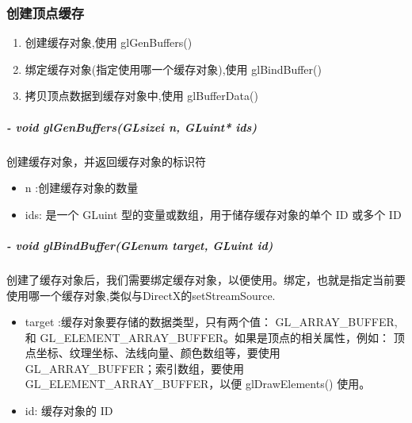 \documentclass[UTF8,a4paper,12pt]{ctexbook}
\begin{document}
		\subsubsection{创建顶点缓存}
			\begin{enumerate}
				\item 创建缓存对象,使用 glGenBuffers()
				\item 绑定缓存对象(指定使用哪一个缓存对象),使用 glBindBuffer()
				\item 拷贝顶点数据到缓存对象中,使用 glBufferData()
			\end{enumerate}
			
			\subparagraph{- void glGenBuffers(GLsizei n, GLuint* ids)}创建缓存对象，并返回缓存对象的标识符
				\begin{itemize}
					\item n :创建缓存对象的数量
					\item ids: 是一个 GLuint 型的变量或数组，用于储存缓存对象的单个 ID 或多个 ID
				\end{itemize}
				
			\subparagraph{- void glBindBuffer(GLenum target, GLuint id)}创建了缓存对象后，我们需要绑定缓存对象，以便使用。绑定，也就是指定当前要使用哪一个缓存对象,类似与DirectX的setStreamSource.
				\begin{itemize}
					\item target :缓存对象要存储的数据类型，只有两个值： GL\_ARRAY\_BUFFER, 和 GL\_ELEMENT\_ARRAY\_BUFFER。如果是顶点的相关属性，例如： 顶点坐标、纹理坐标、法线向量、颜色数组等，要使用 GL\_ARRAY\_BUFFER；索引数组，要使用 GL\_ELEMENT\_ARRAY\_BUFFER，以便 glDrawElements() 使用。
					
					\item id: 缓存对象的 ID
				\end{itemize}
			
\end{document}
